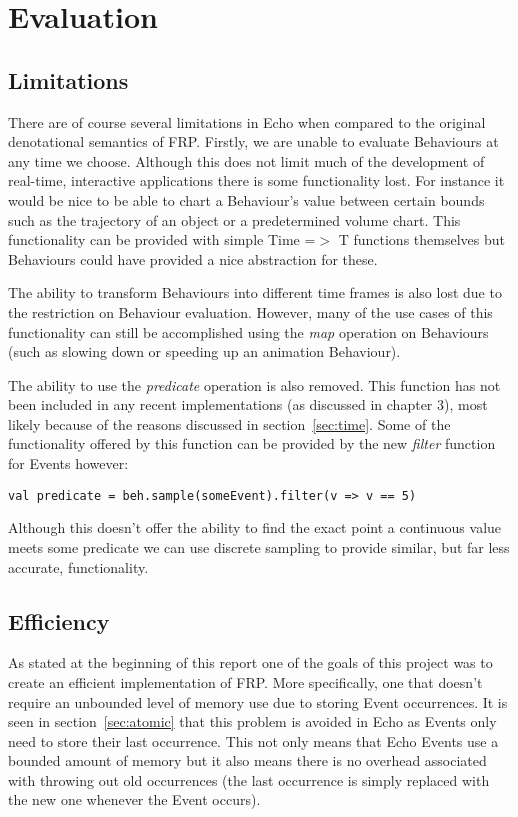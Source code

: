 \chapter{Evaluation}    
  \section{Limitations}
    There are of course several limitations in Echo when compared to the original denotational semantics of FRP. Firstly, we are 
    unable to evaluate Behaviours at any time we choose.
    Although this does not limit much of the development of real-time, interactive applications there is some functionality
    lost. For instance it would be nice to be able to chart a Behaviour's value between certain bounds such as
    the trajectory of an object or a predetermined volume chart. This functionality can be provided with simple
    Time =$>$ T functions themselves but Behaviours could have provided a nice abstraction for these.
    
    The ability to transform Behaviours into different time frames is also lost due to the restriction on Behaviour
    evaluation. However, many of the use cases of this functionality can still be accomplished using the
    \emph{map} operation on Behaviours (such as slowing down or speeding up an animation Behaviour).
    
    The ability to use the \emph{predicate} operation is also removed. This function has not been included in any
    recent implementations (as discussed in chapter 3), most likely because of the reasons discussed in section~\ref{sec:time}. Some of the functionality offered by this function can be provided by the new \emph{filter} function for
    Events however:
    
\begin{verbatim}
val predicate = beh.sample(someEvent).filter(v => v == 5)
\end{verbatim}

    Although this doesn't offer the ability to find the exact point a continuous value meets some predicate we can
    use discrete sampling to provide similar, but far less accurate, functionality.
    
  \section{Efficiency}
    \label{sec:eff}
    As stated at the beginning of this report one of the goals of this project was to create an efficient implementation
    of FRP. More specifically, one that doesn't require an unbounded level of memory use due to storing Event occurrences.
    It is seen in section~\ref{sec:atomic} that this problem is avoided in Echo as Events only need to store their last
    occurrence. This not only means that Echo Events use a bounded amount of memory but it also means there is
    no overhead associated with throwing out old occurrences (the last occurrence is simply replaced with the new 
    one whenever the Event occurs).
    
